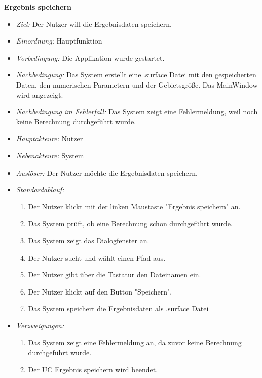 \textbf{Ergebnis speichern}
  \begin{itemize}
  \item \textit{Ziel:} Der Nutzer will die Ergebnisdaten speichern.
  \item \textit{Einordnung:} Hauptfunktion
  \item \textit{Vorbedingung:} Die Applikation wurde gestartet.
  \item \textit{Nachbedingung:} Das System erstellt eine .surface Datei mit den gespeicherten Daten, den numerischen Parametern und der Gebietsgr\"o\ss e. Das MainWindow wird angezeigt.
    \item \textit{Nachbedingung im Fehlerfall:} Das System zeigt eine Fehlermeldung, weil noch keine Berechnung durchgef\"uhrt wurde.
      \item \textit{Hauptakteure:} Nutzer
  \item \textit{Nebenakteure:} System
  \item \textit{Ausl\"oser:} Der Nutzer m\"ochte die Ergebnisdaten speichern.
    \item \textit{Standardablauf:}
    \begin{enumerate}
    \item Der Nutzer klickt mit der linken Maustaste "Ergebnis speichern" an.
    \item Das System pr\"uft, ob eine Berechnung schon durchgef\"uhrt wurde.
    \item Das System zeigt das Dialogfenster an.
    \item Der Nutzer sucht und w\"ahlt einen Pfad aus.
	\item Der Nutzer gibt \"uber die Tastatur den Dateinamen ein.
	\item Der Nutzer klickt auf den Button "Speichern".
	\item Das System speichert die Ergebnisdaten als .surface Datei
  \end{enumerate}
  \item \textit{Verzweigungen:}
    \begin{enumerate}[label=(2\arabic*)]
\item Das System zeigt eine Fehlermeldung an, da zuvor keine Berechnung durchgef\"uhrt wurde.
\item Der UC Ergebnis speichern wird beendet.
    \end{enumerate}
  \end{itemize}